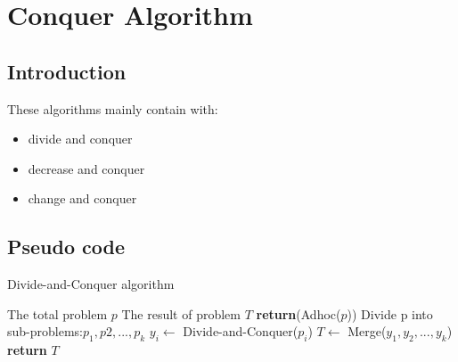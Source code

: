 \documentclass[cs4size, punct, nospace, fancyhdr, fntef]{ctexart}
\begin{document}
  \section{Conquer Algorithm}

  \subsection{Introduction}
    These algorithms mainly contain with:
    \begin{itemize}
      \item divide and conquer
      \item decrease and conquer
      \item change and conquer
    \end{itemize}
  \subsection{Pseudo code}
    \begin{algorithm}
    \caption{Divide-and-Conquer algorithm}\label{dnc}
    \begin{algorithmic}[1] %
    \Require The total problem $p$
    \Ensure The result of problem $T$
        \State \textbf{return}(Adhoc($p$))
      \EndIf
      \State Divide p into sub-problems:${p_1, p2, ..., p_k}$
        \State $y_i\gets$ Divide-and-Conquer($p_i$)
      \EndFor
      \State $T\gets$ Merge($y_1, y_2, ..., y_k$)
      \State \textbf{return} $T$
    \EndFunction
    \end{algorithmic}
    \end{algorithm}
\end{document}
